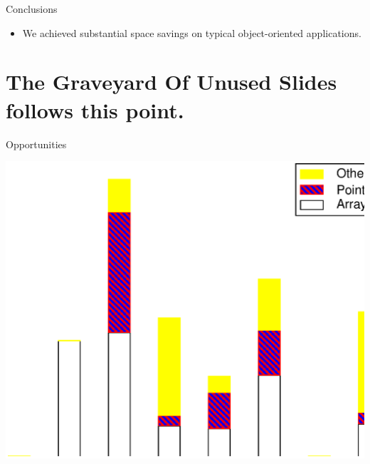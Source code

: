 \documentclass[%
pdf,
colorBG,
slideColor,
nototal,
oqe
]{prosper}
\begin{document}
\begin{slide}{Conclusions}
\begin{itemize}
 \item We achieved substantial space savings on typical
 object-oriented applications.
\end{itemize}
\end{slide}

\part{The Graveyard Of Unused Slides follows this point.}

\begin{slide}{Opportunities}
\begin{center}
\includegraphics[scale=0.45]{Figures/spec-space-2.eps}
\end{center}
\end{slide}

\end{document}
